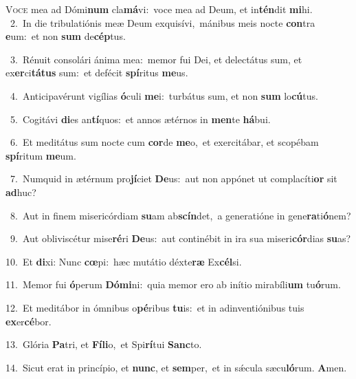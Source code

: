 \lettrine{\initial\textcolor{\initialcolor}{V}}{oce} mea ad Dómi\textbf{num} cla\-\textbf{má}\-vi:~\star voce mea ad Deum, et in\-\textbf{tén}\-dit \textbf{mi}\-hi.\\
{\numbfont\textcolor{\numbcolor}{~2.}}~In die tribulatiónis meæ Deum exquisívi,~\dagger mánibus meis nocte \textbf{con}\-tra \textbf{e}\-um:~\star et non \textbf{sum} de\-\textbf{cép}\-tus.\par
{\numbfont\textcolor{\numbcolor}{~3.}}~Rénuit consolári ánima mea:~\dagger memor fui Dei, et delectátus sum, et ex\-\textbf{er}\-ci\-\textbf{tá}\-\textbf{tus} sum:~\star et defécit \textbf{spí}\-ritus \textbf{me}\-us.\par
{\numbfont\textcolor{\numbcolor}{~4.}}~Anticipavérunt vigílias \textbf{ó}\-culi \textbf{me}\-i:~\star turbátus sum, et non \textbf{sum} lo\-\textbf{cú}\-tus.\par
{\numbfont\textcolor{\numbcolor}{~5.}}~Cogitávi \textbf{di}\-es an\-\textbf{tí}\-quos:~\star et annos ætérnos in \textbf{men}\-te \textbf{há}\-bui.\par
{\numbfont\textcolor{\numbcolor}{~6.}}~Et meditátus sum nocte cum \textbf{cor}\-de \textbf{me}\-o,~\star et exercitábar, et scopébam \textbf{spí}\-ritum \textbf{me}\-um.\par
{\numbfont\textcolor{\numbcolor}{~7.}}~Numquid in ætérnum pro\-\textbf{jí}\-ciet \textbf{De}\-us:~\star aut non appónet ut complacíti\textbf{or} sit \textbf{ad}\-huc?\par
{\numbfont\textcolor{\numbcolor}{~8.}}~Aut in finem misericórdiam \textbf{su}\-am ab\-\textbf{scín}\-det,~\star a generatióne in gene\-\textbf{ra}\-ti\-\textbf{ó}\-nem?\par
{\numbfont\textcolor{\numbcolor}{~9.}}~Aut obliviscétur mise\-\textbf{ré}\-ri \textbf{De}\-us:~\star aut continébit in ira sua miseri\-\textbf{cór}\-dias \textbf{su}\-as?\par
{\numbfont\textcolor{\numbcolor}{10.}}~Et \textbf{di}\-xi: Nunc \textbf{cœ}\-pi:~\star hæc mutátio déxte\textbf{ræ} Ex\-\textbf{cél}\-si.\par
{\numbfont\textcolor{\numbcolor}{11.}}~Memor fui \textbf{ó}\-perum \textbf{Dó}\-\textbf{mi}ni:~\star quia memor ero ab inítio mirabíli\textbf{um} tu\-\textbf{ó}\-rum.\par
{\numbfont\textcolor{\numbcolor}{12.}}~Et meditábor in ómnibus o\-\textbf{pé}\-ribus \textbf{tu}\-is:~\star et in adinventiónibus tuis \textbf{ex}\-er\-\textbf{cé}\-bor.\par
{\numbfont\textcolor{\numbcolor}{13.}}~Glória \textbf{Pa}\-tri, et \textbf{Fí}\-\textbf{li}o,~\star et Spi\-\textbf{rí}\-tui \textbf{Sanc}\-to.\par
{\numbfont\textcolor{\numbcolor}{14.}}~Sicut erat in princípio, et \textbf{nunc}\-, et \textbf{sem}\-per,~\star et in sǽcula sæcu\-\textbf{ló}\-rum. \textbf{A}\-men.\par
